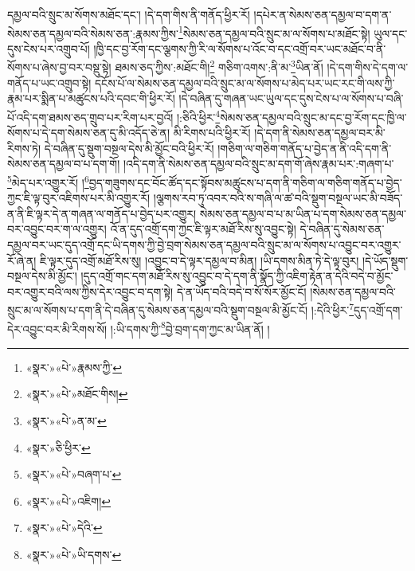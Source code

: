 དམྱལ་བའི་སྲུང་མ་སོགས་མཐོང་དང་། །དེ་དག་གིས་ནི་གནོད་ཕྱིར་རོ། །དཔེར་ན་སེམས་ཅན་དམྱལ་བ་དག་ན་སེམས་ཅན་དམྱལ་བའི་སེམས་ཅན་:རྣམས་ཀྱིས་\footnote{«སྣར་»«པེ་»རྣམས་ཀྱི་}སེམས་ཅན་དམྱལ་བའི་སྲུང་མ་ལ་སོགས་པ་མཐོང་སྟེ། ཡུལ་དང་དུས་ངེས་པར་འགྲུབ་པོ། །ཁྱི་དང་བྱ་རོག་དང་ལྕགས་ཀྱི་རི་ལ་སོགས་པ་འོང་བ་དང་འགྲོ་བར་ཡང་མཐོང་བ་ནི་སོགས་པ་ཞེས་བྱ་བར་བསྡུ་སྟེ། ཐམས་ཅད་ཀྱིས་:མཐོང་གི།\footnote{«སྣར་»«པེ་»མཐོང་གིས།} གཅིག་འགས་:ནི་མ་\footnote{«སྣར་»«པེ་»ན་མ་}ཡིན་ནོ། །དེ་དག་གིས་དེ་དག་ལ་གནོད་པ་ཡང་འགྲུབ་སྟེ། དངོས་པོ་ལ་སེམས་ཅན་དམྱལ་བའི་སྲུང་མ་ལ་སོགས་པ་མེད་པར་ཡང་རང་གི་ལས་ཀྱི་རྣམ་པར་སྨིན་པ་མཚུངས་པའི་དབང་གི་ཕྱིར་རོ། །དེ་བཞིན་དུ་གཞན་ཡང་ཡུལ་དང་དུས་ངེས་པ་ལ་སོགས་པ་བཞི་པོ་འདི་དག་ཐམས་ཅད་གྲུབ་པར་རིག་པར་བྱའོ། །:ཅིའི་ཕྱིར་\footnote{«སྣར་»ཅི་ཕྱིར་}སེམས་ཅན་དམྱལ་བའི་སྲུང་མ་དང་བྱ་རོག་དང་ཁྱི་ལ་སོགས་པ་དེ་དག་སེམས་ཅན་དུ་མི་འདོད་ཅེ་ན། མི་རིགས་པའི་ཕྱིར་རོ། །དེ་དག་ནི་སེམས་ཅན་དམྱལ་བར་མི་རིགས་ཏེ། དེ་བཞིན་དུ་སྡུག་བསྔལ་དེས་མི་མྱོང་བའི་ཕྱིར་རོ། །གཅིག་ལ་གཅིག་གནོད་པ་བྱེད་ན་ནི་འདི་དག་ནི་སེམས་ཅན་དམྱལ་བ་པ་དག་གོ། །འདི་དག་ནི་སེམས་ཅན་དམྱལ་བའི་སྲུང་མ་དག་གོ་ཞེས་རྣམ་པར་:གཞག་པ་\footnote{«སྣར་»«པེ་»བཞག་པ་}མེད་པར་འགྱུར་རོ། །\footnote{«སྣར་»«པེ་»འཇིག།}བྱད་གཟུགས་དང་བོང་ཚོད་དང་སྟོབས་མཚུངས་པ་དག་ནི་གཅིག་ལ་གཅིག་གནོད་པ་བྱེད་ཀྱང་ཇི་ལྟ་བུར་འཇིགས་པར་མི་འགྱུར་རོ། །ལྕགས་རབ་ཏུ་འབར་བའི་ས་གཞི་ལ་ཚ་བའི་སྡུག་བསྔལ་ཡང་མི་བཟོད་ན་ནི་ཇི་ལྟར་དེ་ན་གཞན་ལ་གནོད་པ་བྱེད་པར་འགྱུར། སེམས་ཅན་དམྱལ་བ་པ་མ་ཡིན་པ་དག་སེམས་ཅན་དམྱལ་བར་འབྱུང་བར་ག་ལ་འགྱུར། འོ་ན་དུད་འགྲོ་དག་ཀྱང་ཇི་ལྟར་མཐོ་རིས་སུ་འབྱུང་སྟེ། དེ་བཞིན་དུ་སེམས་ཅན་དམྱལ་བར་ཡང་དུད་འགྲོ་དང་ཡི་དགས་ཀྱི་བྱེ་བྲག་སེམས་ཅན་དམྱལ་བའི་སྲུང་མ་ལ་སོགས་པ་འབྱུང་བར་འགྱུར་རོ་ཞེ་ན། ཇི་ལྟར་དུད་འགྲོ་མཐོ་རིས་སུ། །འབྱུང་བ་དེ་ལྟར་དམྱལ་བ་མིན། །ཡི་དགས་མིན་ཏེ་དེ་ལྟ་བུར། །དེ་ཡོད་སྡུག་བསྔལ་དེས་མི་མྱོང་། །དུད་འགྲོ་གང་དག་མཐོ་རིས་སུ་འབྱུང་བ་དེ་དག་ནི་སྣོད་ཀྱི་འཇིག་རྟེན་ན་དེའི་བདེ་བ་མྱོང་བར་འགྱུར་བའི་ལས་ཀྱིས་དེར་འབྱུང་བ་དག་སྟེ། དེ་ན་ཡོད་བའི་བདེ་བ་སོ་སོར་མྱོང་ངོ། །སེམས་ཅན་དམྱལ་བའི་སྲུང་མ་ལ་སོགས་པ་དག་ནི་དེ་བཞིན་དུ་སེམས་ཅན་དམྱལ་བའི་སྡུག་བསྔལ་མི་མྱོང་ངོ། །:དེའི་ཕྱིར་\footnote{«སྣར་»«པེ་»དེའི་}དུད་འགྲོ་དག་དེར་འབྱུང་བར་མི་རིགས་སོ། །:ཡི་དགས་ཀྱི་\footnote{«སྣར་»«པེ་»ཡི་དགས་}བྱེ་བྲག་དག་ཀྱང་མ་ཡིན་ནོ། །
